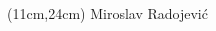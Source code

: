 \begin{changemargin}{-1cm}{-1cm}

\begin{textblock*}{\textwidth}(11cm,24cm)
	{\huge Miroslav Radojevi\'{c}}
\end{textblock*}

\end{changemargin}

